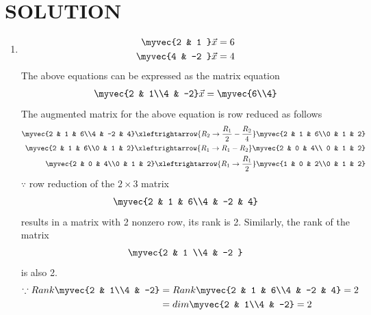 \documentclass[journal,12pt,twocolumn]{IEEEtran}
\begin{document}
\section{SOLUTION}  
\begin{enumerate}
\item
\begin{align}
\begin{split}
\myvec{2 & 1 }\vec{x}&=6
\\
\myvec{4 & -2 }\vec{x}&=4
\end{split}
\end{align}
The above equations can be expressed as the matrix equation
\begin{align}
\myvec{2 & 1\\4 & -2} \vec{x} = \myvec{6\\4}
\end{align}
%
The augmented matrix for the above equation is row reduced as follows
\begin{align}
\myvec{2 & 1 & 6\\4 & -2 & 4} 
\xleftrightarrow{R_2\rightarrow \frac{R_1}{2}-\frac{R_2}{4}}
\myvec{2 & 1 & 6\\0 & 1 & 2}
\\
\myvec{2 & 1 & 6\\0 & 1 & 2}
\xleftrightarrow{R_1\rightarrow R_1-R_2}
\myvec{2 & 0 & 4\\ 0 & 1 & 2}
\\
\myvec{2 & 0 & 4\\0 & 1 & 2}
\xleftrightarrow{R_1\rightarrow\frac{R_1}{2}}
\myvec{1 & 0 & 2\\0 & 1 & 2}
\end{align}
%
$\because$ row reduction of the $2\times 3$ matrix
%
\begin{align}
\myvec{2 & 1 & 6\\4 & -2 & 4}
\end{align}
%
results in a matrix with 2 nonzero row, its rank is 2. 
%
Similarly, the rank of the matrix 
\begin{align}
\myvec{2 & 1 \\4 & -2 } 
\end{align}
%
is also 2.
%
\begin{align}
\because Rank \myvec{2 & 1\\4 & -2} &= Rank\myvec{2 & 1 & 6\\4 & -2 & 4}=2\nonumber\\
&=dim\myvec{2 & 1\\4 & -2}=2
\end{align}

\end{enumerate}
\end{document}
